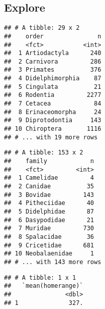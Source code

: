 \documentclass[
]{article}
\newenvironment{Shaded}{\begin{snugshade}}{\end{snugshade}}
\newcommand{\KeywordTok}[1]{\textcolor[rgb]{0.13,0.29,0.53}{\textbf{#1}}}
\newcommand{\NormalTok}[1]{#1}
\newcommand{\OperatorTok}[1]{\textcolor[rgb]{0.81,0.36,0.00}{\textbf{#1}}}
\newcommand{\StringTok}[1]{\textcolor[rgb]{0.31,0.60,0.02}{#1}}
\begin{document}
\hypertarget{explore}{%
\subsection{Explore}\label{explore}}

\begin{Shaded}
\end{Shaded}

\begin{verbatim}
## # A tibble: 29 x 2
##    order               n
##    <fct>           <int>
##  1 Artiodactyla      240
##  2 Carnivora         286
##  3 Primates          376
##  4 Didelphimorphia    87
##  5 Cingulata          21
##  6 Rodentia         2277
##  7 Cetacea            84
##  8 Erinaceomorpha     24
##  9 Diprotodontia     143
## 10 Chiroptera       1116
## # ... with 19 more rows
\end{verbatim}

\begin{Shaded}
\end{Shaded}

\begin{verbatim}
## # A tibble: 153 x 2
##    family            n
##    <fct>         <int>
##  1 Camelidae         4
##  2 Canidae          35
##  3 Bovidae         143
##  4 Pitheciidae      40
##  5 Didelphidae      87
##  6 Dasypodidae      21
##  7 Muridae         730
##  8 Spalacidae       36
##  9 Cricetidae      681
## 10 Neobalaenidae     1
## # ... with 143 more rows
\end{verbatim}

\begin{Shaded}
\end{Shaded}

\begin{verbatim}
## # A tibble: 1 x 1
##   `mean(homerange)`
##               <dbl>
## 1              327.
\end{verbatim}
\end{document}
